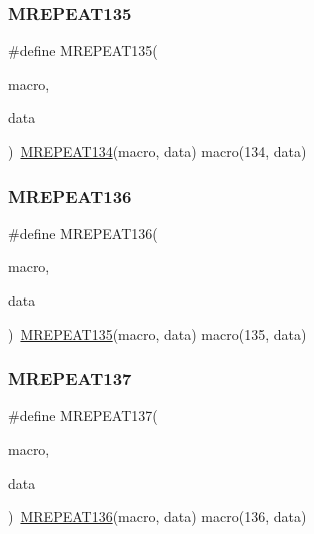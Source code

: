 \mbox{\label{group__group__sam0__utils__mrepeat_ga34c93ca93d79b5955fda5a08fd758e22}} 
\subsubsection{\texorpdfstring{MREPEAT135}{MREPEAT135}}
{\footnotesize\ttfamily \#define M\+R\+E\+P\+E\+A\+T135(\begin{DoxyParamCaption}\item[{}]{macro,  }\item[{}]{data }\end{DoxyParamCaption})~\mbox{\hyperlink{group__group__sam0__utils__mrepeat_gad697f86f8799147acde4ca488f87b446}{M\+R\+E\+P\+E\+A\+T134}}(macro, data)   macro(134, data)}

\mbox{\label{group__group__sam0__utils__mrepeat_ga57d2b47fe36fbbfeb3dc2d4d7aefaeb1}} 
\subsubsection{\texorpdfstring{MREPEAT136}{MREPEAT136}}
{\footnotesize\ttfamily \#define M\+R\+E\+P\+E\+A\+T136(\begin{DoxyParamCaption}\item[{}]{macro,  }\item[{}]{data }\end{DoxyParamCaption})~\mbox{\hyperlink{group__group__sam0__utils__mrepeat_ga34c93ca93d79b5955fda5a08fd758e22}{M\+R\+E\+P\+E\+A\+T135}}(macro, data)   macro(135, data)}

\mbox{\label{group__group__sam0__utils__mrepeat_gaea5f05e5377ed7f7628b6b5bba397523}} 
\subsubsection{\texorpdfstring{MREPEAT137}{MREPEAT137}}
{\footnotesize\ttfamily \#define M\+R\+E\+P\+E\+A\+T137(\begin{DoxyParamCaption}\item[{}]{macro,  }\item[{}]{data }\end{DoxyParamCaption})~\mbox{\hyperlink{group__group__sam0__utils__mrepeat_ga57d2b47fe36fbbfeb3dc2d4d7aefaeb1}{M\+R\+E\+P\+E\+A\+T136}}(macro, data)   macro(136, data)}

